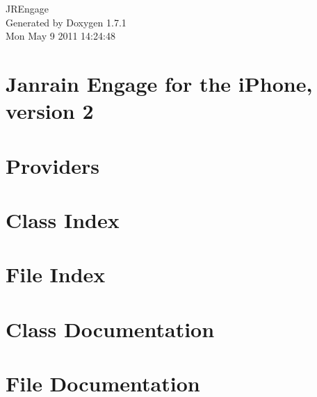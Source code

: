 \documentclass[a4paper]{book}
\begin{document}
\hypersetup{pageanchor=false}
\begin{titlepage}
\vspace*{7cm}
\begin{center}
{\Large JREngage }\\
\vspace*{1cm}
{\large Generated by Doxygen 1.7.1}\\
\vspace*{0.5cm}
{\small Mon May 9 2011 14:24:48}\\
\end{center}
\end{titlepage}
\clearemptydoublepage
{}
\tableofcontents
\clearemptydoublepage
{}
\hypersetup{pageanchor=true}
\chapter{Janrain Engage for the iPhone, version 2}
\label{index}\hypertarget{index}{}
\chapter{Providers}
\label{Providers}
\hypertarget{Providers}{}

\chapter{Class Index}

\chapter{File Index}

\chapter{Class Documentation}









\chapter{File Documentation}

\printindex
\end{document}
